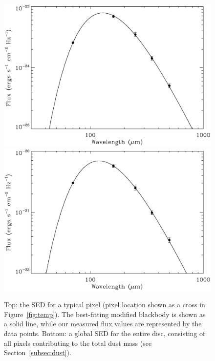 \begin{figure}
 \centering
 \includegraphics[width=12.0cm]{ch2/Fig3a_CenA_example_SED}
 \includegraphics[width=12.0cm]{ch2/Fig3b_CenA_global_sed}
\caption[Spectral energy distributions modelled by a modified blackbody for a typical pixel and the entire disc in Centaurus~A]{Top: the SED for a typical pixel (pixel location shown as a cross in Figure~\ref{fig:temp}).  The best-fitting modified blackbody is shown as a solid line, while our measured flux values are represented by the data points. Bottom: a global SED for the entire disc, consisting of all pixels contributing to the total dust mass (see Section~\ref{subsec:dust}).}
\label{fig:sed}
\end{figure}

